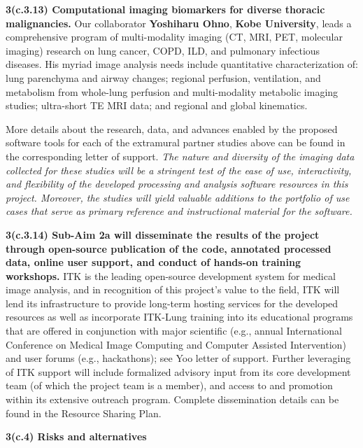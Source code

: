\documentclass[11pt,]{article}
\begin{document}
\textbf{3(c.3.13) Computational imaging biomarkers for diverse thoracic
malignancies.} Our collaborator \textbf{Yoshiharu Ohno}, \textbf{Kobe
University}, leads a comprehensive program of multi-modality imaging
(CT, MRI, PET, molecular imaging) research on lung cancer, COPD, ILD,
and pulmonary infectious diseases. His myriad image analysis needs
include quantitative characterization of: lung parenchyma and airway
changes; regional perfusion, ventilation, and metabolism from whole-lung
perfusion and multi-modality metabolic imaging studies; ultra-short TE
MRI data; and regional and global kinematics.

More details about the research, data, and advances enabled by the
proposed software tools for each of the extramural partner studies above
can be found in the corresponding letter of support. \emph{The nature
and diversity of the imaging data collected for these studies will be a
stringent test of the ease of use, interactivity, and flexibility of the
developed processing and analysis software resources in this project.
Moreover, the studies will yield valuable additions to the portfolio of
use cases that serve as primary reference and instructional material for
the software.}

\textbf{3(c.3.14) Sub-Aim 2a will disseminate the results of the project
through open-source publication of the code, annotated processed data,
online user support, and conduct of hands-on training workshops.} ITK is
the leading open-source development system for medical image analysis,
and in recognition of this project's value to the field, ITK will lend
its infrastructure to provide long-term hosting services for the
developed resources as well as incorporate ITK-Lung training into its
educational programs that are offered in conjunction with major
scientific (e.g., annual International Conference on Medical Image
Computing and Computer Assisted Intervention) and user forums (e.g.,
hackathons); see Yoo letter of support. Further leveraging of ITK
support will include formalized advisory input from its core development
team (of which the project team is a member), and access to and
promotion within its extensive outreach program. Complete dissemination
details can be found in the Resource Sharing Plan.

\textbf{3(c.4) Risks and alternatives}
\end{document}

